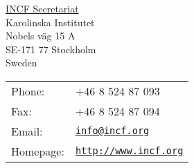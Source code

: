 \documentclass[a4paper]{article}
\begin{document}
\begin{center}
  \begin{minipage}{0.45\linewidth}
    \href{http://www.incf.org}{INCF Secretariat} \\
    Karolinska Institutet \\
    Nobels väg 15 A \\
    SE-171 77 Stockholm \\
    Sweden
  \end{minipage}
  \begin{minipage}{0.45\linewidth}
    \begin{tabular}{ll}
      Phone: & +46 8 524 87 093 \\
      Fax: & +46 8 524 87 094 \\
      Email: & \href{mailto:info@incf.org}{\tt info@incf.org} \\
      Homepage: & \href{http://www.incf.org}{\tt http://www.incf.org} \\
    \end{tabular}
  \end{minipage}
\end{center}
\end{document}
